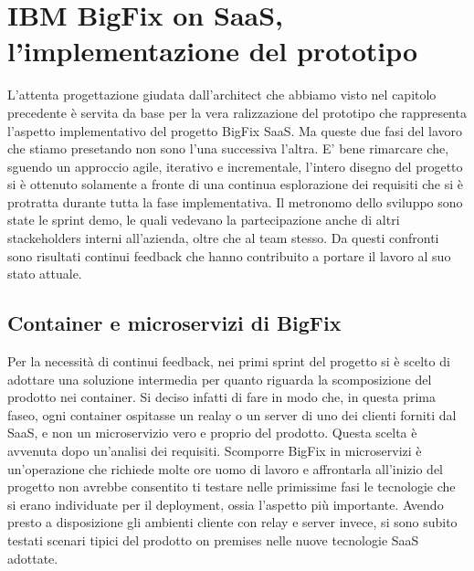 \chapter{IBM BigFix on SaaS, l'implementazione del prototipo}
L'attenta progettazione giudata dall'architect che abbiamo visto nel capitolo precedente è servita da base per la vera ralizzazione del prototipo che rappresenta l'aspetto implementativo del progetto BigFix SaaS. Ma queste due fasi del lavoro che stiamo presetando non sono l'una successiva l'altra. E' bene rimarcare che, sguendo un approccio agile, iterativo e incrementale, l'intero disegno del progetto si è ottenuto solamente a fronte di una continua esplorazione dei requisiti che si è protratta durante tutta la fase implementativa. Il metronomo dello sviluppo sono state le sprint demo, le quali vedevano la partecipazione anche di altri stackeholders interni all'azienda, oltre che al team stesso. Da questi confronti sono risultati continui feedback che hanno contribuito a portare il lavoro al suo stato attuale.

\section{Container e microservizi di BigFix}
Per la necessità di continui feedback, nei primi sprint del progetto si è scelto di adottare una soluzione intermedia per quanto riguarda la scomposizione del prodotto nei container. Si deciso infatti di fare in modo che, in questa prima faseo, ogni container ospitasse un realay o un server di uno dei clienti forniti dal SaaS, e non un microservizio vero e proprio del prodotto. Questa scelta è avvenuta dopo un'analisi dei requisiti. Scomporre BigFix in microservizi è un'operazione che richiede molte ore uomo di lavoro e affrontarla all'inizio del progetto non avrebbe consentito ti testare nelle primissime fasi le tecnologie che si erano individuate per il deployment, ossia l'aspetto più importante. Avendo presto a disposizione gli ambienti cliente con relay e server invece, si sono subito testati scenari tipici del prodotto on premises nelle nuove tecnologie SaaS adottate.

